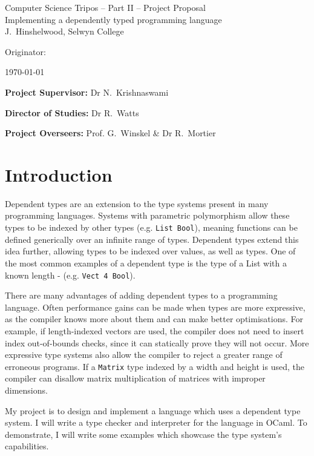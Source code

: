 \documentclass[12pt,a4paper,twoside]{article}
\begin{document}
\begin{center}
\Large
Computer Science Tripos -- Part II -- Project Proposal\\[4mm]
\LARGE
Implementing a dependently typed programming language\\[4mm]

\large
J.~Hinshelwood, Selwyn College

Originator:

\today
\end{center}

\vspace{5mm}

\textbf{Project Supervisor:} Dr N.~Krishnaswami

\textbf{Director of Studies:} Dr R.~Watts

\textbf{Project Overseers:} Prof. G.~Winskel \& Dr R.~Mortier


\section*{Introduction}

Dependent types are an extension to the type systems present in many programming languages.
Systems with parametric polymorphism allow these types to be indexed by other types (e.g. \lstinline{List Bool}), meaning functions can be defined generically over an infinite range of types.
Dependent types extend this idea further, allowing types to be indexed over values, as well as types.
One of the most common examples of a dependent type is the type of a List with a known length - (e.g. \lstinline{Vect 4 Bool}).

There are many advantages of adding dependent types to a programming language.
Often performance gains can be made when types are more expressive, as the compiler knows more about them and can make better optimisations.
For example, if length-indexed vectors are used, the compiler does not need to insert index out-of-bounds checks, since it can statically prove they will not occur.
More expressive type systems also allow the compiler to reject a greater range of erroneous programs.
If a \lstinline{Matrix} type indexed by a width and height is used, the compiler can disallow matrix multiplication of matrices with improper dimensions.

My project is to design and implement a language which uses a dependent type system.
I will write a type checker and interpreter for the language in OCaml.
To demonstrate, I will write some examples which showcase the type system's capabilities.
\end{document}
